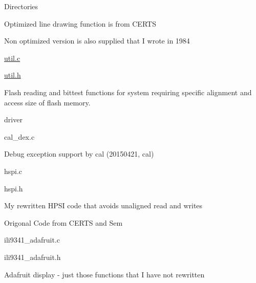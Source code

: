 \begin{DoxyParagraph}{Directories}
\begin{DoxyItemize}
\begin{DoxyItemize}
\begin{DoxyItemize}
\begin{DoxyItemize}
\item Optimized line drawing function is from C\-E\-R\-T\-S
\item Non optimized version is also supplied that I wrote in 1984
\end{DoxyItemize}
\end{DoxyItemize}
\item \hyperlink{util_8c}{util.\-c}
\item \hyperlink{util_8h}{util.\-h}
\begin{DoxyItemize}
\item Flash reading and bittest functions for system requiring specific alignment and access size of flash memory.
\end{DoxyItemize}
\end{DoxyItemize}
\item driver
\begin{DoxyItemize}
\item cal\-\_\-dex.\-c
\begin{DoxyItemize}
\item Debug exception support by cal (20150421, cal)
\end{DoxyItemize}
\item hspi.\-c
\item hspi.\-h
\begin{DoxyItemize}
\item My rewritten H\-P\-S\-I code that avoids unaligned read and writes
\item Origonal Code from C\-E\-R\-T\-S and Sem
\end{DoxyItemize}
\item ili9341\-\_\-adafruit.\-c
\item ili9341\-\_\-adafruit.\-h
\begin{DoxyItemize}
\item Adafruit display -\/ just those functions that I have not rewritten
\end{DoxyItemize}
\end{DoxyItemize}
\end{DoxyItemize}
\end{DoxyParagraph}

